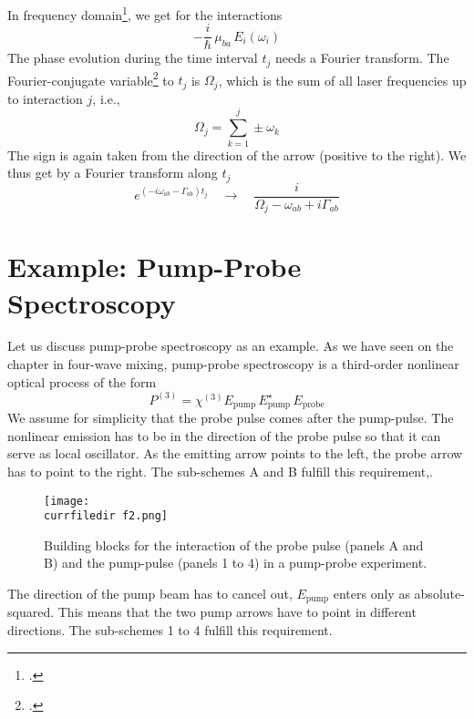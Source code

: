 In frequency domain\footcite{Boyd2008,Shen2003}, we get for the interactions
\begin{equation}
 - \frac{i}{\hbar} \, \mu_{ba} \, E_i(\omega_i)  
\end{equation}
The phase evolution during the time interval $t_j$ needs a Fourier transform. 
The Fourier-conjugate variable\footcite{Tokmakoff09} to $t_j$  is $\Omega_j$, which is the sum of all laser frequencies up to interaction $j$, i.e.,
\begin{equation}
 \Omega_j = \sum_{k=1}^j \pm \omega_k
\end{equation}
The sign is again taken from the direction of the arrow (positive to the right). We thus get
 by a Fourier transform  along $t_j$ 
\begin{equation}
 e^{ (-i \omega_{ab} - \Gamma_{ab}) t_j }  \quad \rightarrow \quad
 \frac{i }{\Omega_j - \omega_{ab}  + i \Gamma_{ab} } 
\end{equation}




\section{Example: Pump-Probe Spectroscopy}

Let us discuss pump-probe spectroscopy as an example. As we have seen on the chapter in four-wave mixing, pump-probe spectroscopy is a third-order nonlinear optical process of the form
\begin{equation}
 P^{(3)} =  \chi^{(3)} E_\text{pump} \, E_\text{pump}^\star \, E_\text{probe}
\end{equation}
We assume for simplicity that the probe pulse comes after the pump-pulse. The nonlinear emission has to be in the direction of the probe pulse so that it can serve as local oscillator. As the emitting arrow points to the left, the probe arrow has to point to the right. The sub-schemes A and B fulfill this requirement,.


\begin{figure}
\texttt{[image: \\currfiledir f2.png]}
\caption{
Building blocks for the interaction of the probe pulse (panels A and B) and the pump-pulse (panels 1 to 4) in a pump-probe experiment.}
\label{fig_2d_f2}
\end{figure}

The direction of the pump beam has to cancel out, $E_\text{pump} $ enters only as absolute-squared. This means that the two pump arrows have to point in different directions. The sub-schemes 1 to 4 fulfill this requirement.

